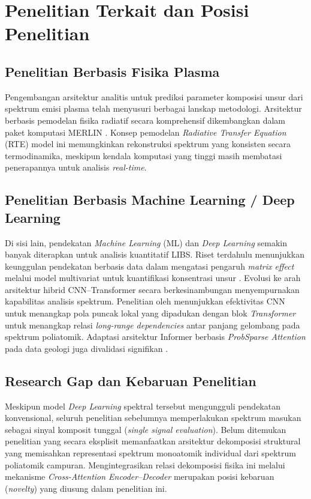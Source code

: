 \section{Penelitian Terkait dan Posisi Penelitian}

\subsection{Penelitian Berbasis Fisika Plasma}

Pengembangan arsitektur analitis untuk prediksi parameter komposisi unsur dari spektrum emisi plasma telah menyusuri berbagai lanskap metodologi. Arsitektur berbasis pemodelan fisika radiatif secara komprehensif dikembangkan dalam paket komputasi MERLIN \citep{favre_merlin_2025, favre_towards_2025}. Konsep pemodelan \textit{Radiative Transfer Equation} (RTE) model ini memungkinkan rekonstruksi spektrum yang konsisten secara termodinamika, meskipun kendala komputasi yang tinggi masih membatasi penerapannya untuk analisis \textit{real-time}.

\subsection{Penelitian Berbasis Machine Learning / Deep Learning}

Di sisi lain, pendekatan \textit{Machine Learning} (ML) dan \textit{Deep Learning} semakin banyak diterapkan untuk analisis kuantitatif LIBS. Riset terdahulu menunjukkan keunggulan pendekatan berbasis data dalam mengatasi pengaruh \textit{matrix effect} melalui model multivariat untuk kuantifikasi konsentrasi unsur \citep{hao_machine_2024, wang_simulation_2024}. Evolusi ke arah arsitektur hibrid CNN--Transformer secara berkesinambungan menyempurnakan kapabilitas analisis spektrum. Penelitian oleh \citet{liu_remote_2026} menunjukkan efektivitas CNN untuk menangkap pola puncak lokal yang dipadukan dengan blok \textit{Transformer} untuk menangkap relasi \textit{long-range dependencies} antar panjang gelombang pada spektrum poliatomik. Adaptasi arsitektur Informer berbasis \textit{ProbSparse Attention} pada data geologi juga divalidasi signifikan \citep{walidain_informer-based_2026, zhou_informer_2021}.

\subsection{Research Gap dan Kebaruan Penelitian}

Meskipun model \textit{Deep Learning} spektral tersebut mengungguli pendekatan konvensional, seluruh penelitian sebelumnya memperlakukan spektrum masukan sebagai sinyal komposit tunggal (\textit{single signal evaluation}). Belum ditemukan penelitian yang secara eksplisit memanfaatkan arsitektur dekomposisi struktural yang memisahkan representasi spektrum monoatomik individual dari spektrum poliatomik campuran. Mengintegrasikan relasi dekomposisi fisika ini melalui mekanisme \textit{Cross-Attention Encoder--Decoder} merupakan posisi kebaruan (\textit{novelty}) yang diusung dalam penelitian ini.